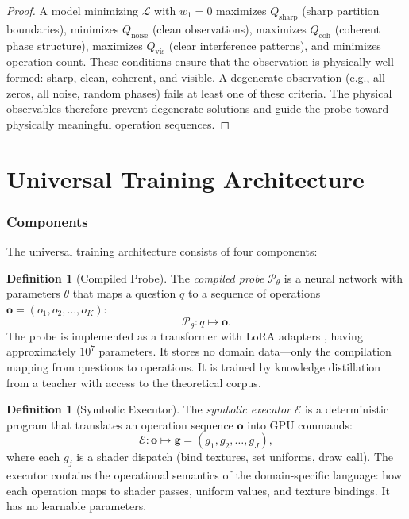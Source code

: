 \documentclass[11pt,twocolumn,a4paper]{article}
\theoremstyle{definition}
\newtheorem{definition}[theorem]{Definition}
\theoremstyle{remark}
\newcommand{\loss}{\mathcal{L}}
\newcommand{\params}{\theta}
\newcommand{\probe}{\mathcal{P}}
\newcommand{\engine}{\mathcal{E}}
\newcommand{\Qsharp}{Q_{\mathrm{sharp}}}
\newcommand{\Qnoise}{Q_{\mathrm{noise}}}
\newcommand{\Qcoh}{Q_{\mathrm{coh}}}
\newcommand{\Qvis}{Q_{\mathrm{vis}}}
\begin{document}
\begin{proof}
A model minimizing $\loss$ with $w_1 = 0$ maximizes $\Qsharp$ (sharp partition boundaries), minimizes $\Qnoise$ (clean observations), maximizes $\Qcoh$ (coherent phase structure), maximizes $\Qvis$ (clear interference patterns), and minimizes operation count. These conditions ensure that the observation is physically well-formed: sharp, clean, coherent, and visible. A degenerate observation (e.g., all zeros, all noise, random phases) fails at least one of these criteria. The physical observables therefore prevent degenerate solutions and guide the probe toward physically meaningful operation sequences.
\end{proof}



\part{Universal Training Architecture}

\section{Components}
\label{sec:components}

The universal training architecture consists of four components:

\begin{definition}[Compiled Probe]
\label{def:compiled_probe}
The \emph{compiled probe} $\probe_\params$ is a neural network with parameters $\params$ that maps a question $q$ to a sequence of operations $\mathbf{o} = (o_1, o_2, \ldots, o_K)$:
\[
\probe_\params: q \mapsto \mathbf{o}.
\]
The probe is implemented as a transformer \citep{vaswani2017} with LoRA adapters \citep{hu2022}, having approximately $10^7$ parameters. It stores no domain data---only the compilation mapping from questions to operations. It is trained by knowledge distillation \citep{hinton2015} from a teacher with access to the theoretical corpus.
\end{definition}

\begin{definition}[Symbolic Executor]
\label{def:executor}
The \emph{symbolic executor} $\engine$ is a deterministic program that translates an operation sequence $\mathbf{o}$ into GPU commands:
\[
\engine: \mathbf{o} \mapsto \mathbf{g} = (g_1, g_2, \ldots, g_J),
\]
where each $g_j$ is a shader dispatch (bind textures, set uniforms, draw call). The executor contains the operational semantics of the domain-specific language: how each operation maps to shader passes, uniform values, and texture bindings. It has no learnable parameters.
\end{definition}
\end{document}

